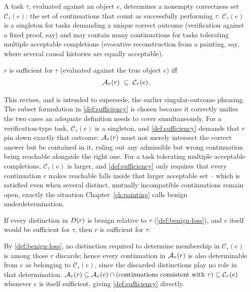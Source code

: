 \begin{definition}
\label{def:correctness-set}
A task $\tau$, evaluated against an object $e$, determines a nonempty
correctness set $\mathcal{C}_\tau(e)$: the set of continuations that count
as successfully performing $\tau$. $\mathcal{C}_\tau(e)$ is a singleton for
tasks demanding a unique correct outcome (verification against a fixed
proof, say) and may contain many continuations for tasks tolerating
multiple acceptable completions (evocative reconstruction from a
painting, say, where several causal histories are equally acceptable).
\end{definition}

\begin{definition}
\label{def:sufficiency}
$r$ is sufficient for $\tau$ (evaluated against the true object $e$) iff
\[
\mathcal{A}_{\tau}(r) \;\subseteq\; \mathcal{C}_\tau(e).
\]
\end{definition}

This revises, and is intended to supersede, the earlier singular-outcome
phrasing. The subset formulation in \cref{def:sufficiency} is chosen
because it correctly unifies the two cases an adequate definition needs to
cover simultaneously. For a verification-type task, $\mathcal{C}_\tau(e)$
is a singleton, and \cref{def:sufficiency} demands that $r$ pin down
exactly that outcome: $\mathcal{A}_{\tau}(r)$ must not merely intersect the
correct answer but be contained in it, ruling out any admissible but wrong
continuation being reachable alongside the right one. For a task
tolerating multiple acceptable completions, $\mathcal{C}_\tau(e)$ is
larger, and \cref{def:sufficiency} only requires that every continuation
$r$ makes reachable falls inside that larger acceptable set -- which is
satisfied even when several distinct, mutually incompatible continuations
remain open, exactly the situation Chapter~\ref{ch:painting} calls benign
underdetermination.

\begin{proposition}
\label{prop:benign-preserves-sufficiency}
If every distinction in $D(r)$ is benign relative to $\tau$
(\cref{def:benign-loss}), and $e$ itself would be sufficient for $\tau$,
then $r$ is sufficient for $\tau$.
\end{proposition}

\begin{proofsketch}
By \cref{def:benign-loss}, no distinction required to determine membership
in $\mathcal{C}_\tau(e)$ is among those $r$ discards; hence every
continuation in $\mathcal{A}_{\tau}(r)$ is also determinable from $e$ as
belonging to $\mathcal{C}_\tau(e)$, since the discarded distinctions play
no role in that determination. $\mathcal{A}_{\tau}(r) \subseteq
\mathcal{A}_{\tau}(e) \cap (\text{continuations consistent with } \tau)
\subseteq \mathcal{C}_\tau(e)$ whenever $e$ is itself sufficient, giving
\cref{def:sufficiency} directly.
\end{proofsketch}

